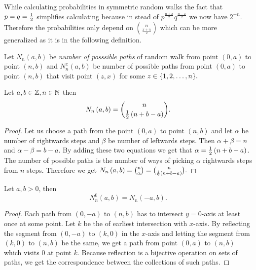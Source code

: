 \begin{rem}
 While calculating probabilities in symmetric random walks the fact that $p=q=\frac{1}{2}$ simplifies calculating because in stead of $p^{\frac{n+x}{2}}q^{\frac{n-x}{2}}$ we now have $2^{-n}.$ Therefore the probabilities only depend on $\binom{n}{\frac{x+n}{2}}$ which can be more generalized as it is in the following definition.
\end{rem}

\begin{defn}\label{defn-number_possible_paths}
 Let $N_n \left( a,b \right) $ be \emph{number of posssible paths} of random walk \rw from point $ \left( 0,a \right) $ to point $ \left( n,b \right)$
 and $N_n^x \left( a,b \right) $ be number of possible paths from point $ \left( 0,a \right) $ to point $\left( n,b \right)$
 that visit point $\left(z,x\right)$ for some $z \in \{1,2,\ldots, n\}.$
\end{defn}
\begin{thm}\label{thm-number_of_possible_paths}
 Let $a,b \in \mathbb{Z}, n \in \mathbb{N}$ then
 \[
    N_n \left( a,b \right) =\binom{n}{\frac{1}{2} \left(n+b-a \right)}.
  \]
\end{thm}
\begin{proof}
 Let us choose a path from the point $ \left( 0,a \right) $ to point $ \left( n,b \right) $ and let $\alpha$ be number of rightwards steps and $\beta$ be number of leftwards steps.
 Then $\alpha+\beta=n$ and $\alpha-\beta=b-a$. By adding these two equations we get that $\alpha=\frac{1}{2} \left( n+b-a \right) $.
 The number of possible paths is the number of ways of picking $\alpha$ rightwards steps from $n$ steps.
 Therefore we get $N_n \left( a,b \right) =\binom{n}{\alpha}=\binom{n}{\frac{1}{2} \left( n+b-a \right) }.$
\end{proof}

\begin{thm}\label{thm-reflection_principle}
 Let $a,b >0$, then
 \[
    N_n^0 \left( a,b \right) =N_n \left( -a,b \right).
  \]
\end{thm}
\begin{proof}
 Each path from $ \left( 0,-a \right) $ to $ \left( n,b \right) $ has to intersect $y=0$-axis at least once at some point.
 Let $k$ be the \Time of earliest intersection with $x$-axis. By reflecting the segment from $\left( 0,-a \right)$ to $\left( k,0 \right)$ in the $x$-axis and letting the segment from $\left(k,0\right)$ to $\left(n,b\right)$ be the same,
 we get a path from point $\left( 0,a \right)$ to $ \left(n,b\right)$ which visits $0$ at point $k$.
 Because reflection is a bijective operation on sets of paths, we get the correspondence between the collections of such paths.
\end{proof}


